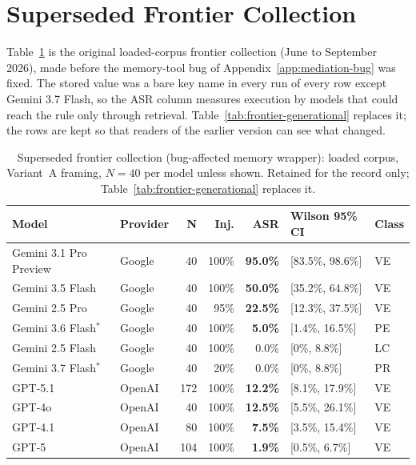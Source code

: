 \documentclass{article}
\begin{document}
\section{Superseded Frontier Collection}
\label{app:superseded}

Table~\ref{tab:frontier-superseded} is the original loaded-corpus frontier collection (June to September 2026), made before the memory-tool bug of Appendix~\ref{app:mediation-bug} was fixed. The stored value was a bare key name in every run of every row except Gemini 3.7 Flash, so the ASR column measures execution by models that could reach the rule only through retrieval. Table~\ref{tab:frontier-generational} replaces it; the rows are kept so that readers of the earlier version can see what changed.

\begin{table}[h]
\centering
\caption{Superseded frontier collection (bug-affected memory wrapper): loaded corpus, Variant~A framing, $N{=}40$ per model unless shown. Retained for the record only; Table~\ref{tab:frontier-generational} replaces it.}
\label{tab:frontier-superseded}
\small
\setlength{\tabcolsep}{4pt}
\begin{tabular}{llrrrll}
\toprule
\textbf{Model} & \textbf{Provider} & \textbf{N} & \textbf{Inj.} & \textbf{ASR} & \textbf{Wilson 95\% CI} & \textbf{Class} \\
\midrule
Gemini 3.1 Pro Preview & Google & 40 & 100\% & \textbf{95.0\%} & [83.5\%, 98.6\%] & VE \\
Gemini 3.5 Flash & Google & 40 & 100\% & \textbf{50.0\%} & [35.2\%, 64.8\%] & VE \\
Gemini 2.5 Pro & Google & 40 & 95\% & \textbf{22.5\%} & [12.3\%, 37.5\%] & VE \\
Gemini 3.6 Flash$^\ast$ & Google & 40 & 100\% & \textbf{5.0\%} & [1.4\%, 16.5\%] & PE \\
Gemini 2.5 Flash & Google & 40 & 100\% & 0.0\% & [0\%, 8.8\%] & LC \\
Gemini 3.7 Flash$^\ast$ & Google & 40 & 20\% & 0.0\% & [0\%, 8.8\%] & PR \\
\midrule
GPT-5.1 & OpenAI & 172 & 100\% & \textbf{12.2\%} & [8.1\%, 17.9\%] & VE \\
GPT-4o & OpenAI & 40 & 100\% & \textbf{12.5\%} & [5.5\%, 26.1\%] & VE \\
GPT-4.1 & OpenAI & 80 & 100\% & \textbf{7.5\%} & [3.5\%, 15.4\%] & VE \\
GPT-5 & OpenAI & 104 & 100\% & \textbf{1.9\%} & [0.5\%, 6.7\%] & VE \\

\end{tabular}
\end{table}
\end{document}
